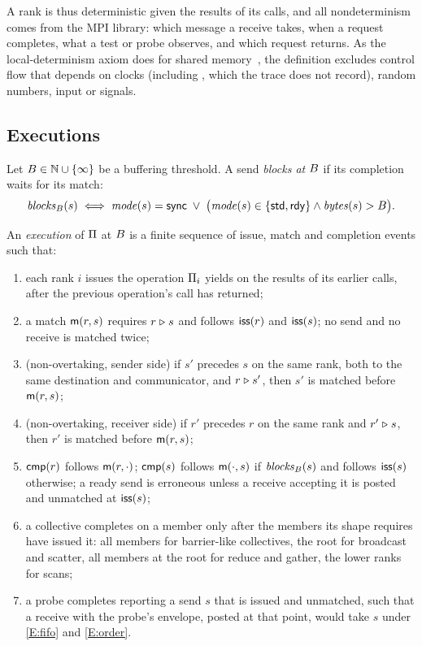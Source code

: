 A rank is thus deterministic given the results of its calls, and all nondeterminism comes
from the MPI library: which message a receive takes, when a request completes, what a test or
probe observes, and which request  returns. As the local-determinism axiom
does for shared memory~\citep{serbanuta12mcm}, the definition excludes control flow that
depends on clocks (including , which the trace does not record), random
numbers, input or signals.

\subsection{Executions}

Let $B\in\mathbb{N}\cup\{\infty\}$ be a buffering threshold. A send \emph{blocks at
$B$} if its completion waits for its match:
\[
\mathit{blocks}_B(s) \iff \mathit{mode}(s)=\mathsf{sync} \;\lor\;
  \bigl(\mathit{mode}(s)\in\{\mathsf{std},\mathsf{rdy}\} \land \mathit{bytes}(s)>B\bigr).
\]

\begin{definition}[Execution]
An \emph{execution} of $\Pi$ at $B$ is a finite sequence of issue, match and
completion events such that:
\begin{enumerate}[leftmargin=*,label=(E\arabic*)]
\item\label{E:po} each rank $i$ issues the operation $\Pi_i$ yields on the results of
  its earlier calls, after the previous operation's call has returned;
\item\label{E:match} a match $\mathsf{m}(r,s)$ requires $r\mathrel{\triangleright} s$ and follows
  $\mathsf{iss}(r)$ and $\mathsf{iss}(s)$; no send and no receive is matched twice;
\item\label{E:fifo} (non-overtaking, sender side) if $s'$ precedes $s$ on the same rank,
  both to the same destination and communicator, and $r\mathrel{\triangleright} s'$, then $s'$ is matched
  before $\mathsf{m}(r,s)$;
\item\label{E:order} (non-overtaking, receiver side) if $r'$ precedes $r$ on the same rank
  and $r'\mathrel{\triangleright} s$, then $r'$ is matched before $\mathsf{m}(r,s)$;
\item\label{E:compl} $\mathsf{cmp}(r)$ follows $\mathsf{m}(r,\cdot)$; $\mathsf{cmp}(s)$ follows
  $\mathsf{m}(\cdot,s)$ if $\mathit{blocks}_B(s)$ and follows $\mathsf{iss}(s)$ otherwise; a ready send
  is erroneous unless a receive accepting it is posted and unmatched at $\mathsf{iss}(s)$;
\item\label{E:coll} a collective completes on a member only after the members its shape
  requires have issued it: all members for barrier-like collectives, the root for
  broadcast and scatter, all members at the root for reduce and gather, the lower ranks
  for scans;
\item\label{E:probe} a probe completes reporting a send $s$ that is issued and unmatched, such
  that a receive with the probe's envelope, posted at that point, would take $s$ under
  \ref{E:fifo} and \ref{E:order}.
\end{enumerate}
\end{definition}

